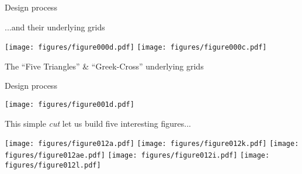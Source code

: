 \documentclass[14pt]{beamer}
\begin{document}

    \begin{frame}{Design process}
        \begin{center}
            ...and their underlying grids\\\phantom{the study of two other 5-piece tangrams...}

            \bigskip

            \texttt{[image: figures/figure000d.pdf]} \qquad \texttt{[image: figures/figure000c.pdf]} \\

            \bigskip

            {\small The ``Five Triangles'' \& ``Greek-Cross'' underlying grids}
        \end{center}
    \end{frame}


    \begin{frame}{Design process}
        \begin{center}
            \texttt{[image: figures/figure001d.pdf]} \\

            \bigskip\bigskip

            This simple \emph{cut} let us build five interesting figures...

            \bigskip\bigskip

            \texttt{[image: figures/figure012a.pdf]}\quad
            \texttt{[image: figures/figure012k.pdf]}\;\;
            \texttt{[image: figures/figure012ae.pdf]}
            \texttt{[image: figures/figure012i.pdf]}\quad
            \texttt{[image: figures/figure012l.pdf]}\\
        \end{center}
    \end{frame}

\end{document}
